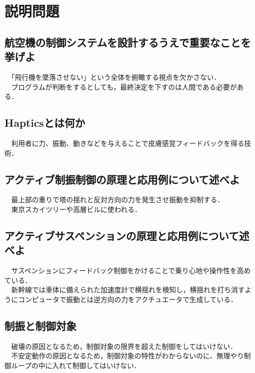 

\pagestyle{fancy}
\section{説明問題}
\subsection{航空機の制御システムを設計するうえで重要なことを挙げよ}
　「飛行機を墜落させない」という全体を俯瞰する視点を欠かさない．\\
　プログラムが判断をするとしても，最終決定を下すのは人間である必要がある．

\subsection{Hapticsとは何か}
　利用者に力、振動、動きなどを与えることで皮膚感覚フィードバックを得る技術．\\

\subsection{アクティブ制振制御の原理と応用例について述べよ}
　最上部の重りで塔の揺れと反対方向の力を発生させ振動を抑制する．\\
　東京スカイツリーや高層ビルに使われる．

\subsection{アクティブサスペンションの原理と応用例について述べよ}
　サスペンションにフィードバック制御をかけることで乗り心地や操作性を高めている．\\
　新幹線では車体に備えられた加速度計で横揺れを検知し，横揺れを打ち消すようにコンピュータで振動とは逆方向の力をアクチュエータで生成している．

\subsection{制振と制御対象}
　破壊の原因となるため，制御対象の限界を超えた制御をしてはいけない．\\
　不安定動作の原因となるため，制御対象の特性がわからないのに、無理やり制御ループの中に入れて制御してはいけない．

